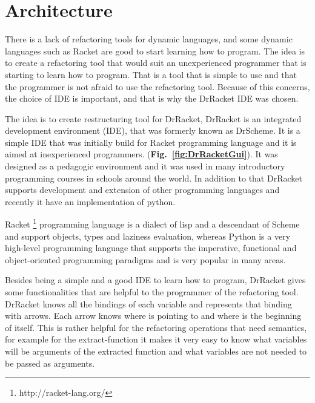 
% 
% 


\section{Architecture}

There is a lack of refactoring tools for dynamic languages, and some dynamic languages such as Racket are good to start learning how to program.
The idea is to create a refactoring tool that would suit an unexperienced programmer that is starting to learn how to program. That is a tool that is simple to use and that the programmer is not afraid to use the refactoring tool.
Because of this concerns, the choice of IDE is important, and that is why the DrRacket IDE was chosen.

The idea is to create restructuring tool for DrRacket, DrRacket is an integrated development environment (IDE), that was formerly known as DrScheme. It is a simple IDE that was initially build for Racket programming language and it is aimed at inexperienced programmers. ({\bf Fig.~\ref{fig:DrRacketGui}}).
It was designed as a pedagogic environment \cite{drscheme_pegadogy} and it was used in many introductory programming courses in schools around the world. In addition to that DrRacket supports development and extension of other programming languages \cite{tobin2011languages} and recently it have an implementation of python. \cite{ramos2014implementation}


Racket \footnote{http://racket-lang.org/} programming language is a dialect of lisp and a descendant of Scheme and support objects, types and laziness evaluation,
whereas Python is a very high-level programming language that supports the imperative, functional and object-oriented programming paradigms and is very popular in many areas.

Besides being a simple and a good IDE to learn how to program, DrRacket gives some functionalities that are helpful to the programmer of the refactoring tool. DrRacket knows all the bindings of each variable and represents that binding with arrows. Each arrow knows where is pointing to and where is the beginning of itself. This is rather helpful for the refactoring operations that need semantics, for example for the extract-function it makes it very easy to know what variables will be arguments of the extracted function and what variables are not needed to be passed as arguments.


